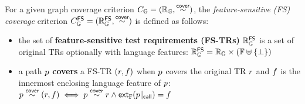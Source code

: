 \begin{definition}\label{def:fs-cov}
  For a given graph coverage criterion $C_{\mathbb{G}} = (\mathbb{R}_{\mathbb{G}},
  \overset{\textsf{cover}}{\sim})$, the \textit{feature-sensitive (FS) coverage} criterion
  $C_{\mathbb{G}}^{\textsf{FS}} = (\mathbb{R}_{\mathbb{G}}^{\textsf{FS}}, \overset{\textsf{cover}}{\sim})$ is defined as follows:
  \begin{itemize}
    \item the set of \textbf{feature-sensitive test requirements (FS-TRs)}
      $\mathbb{R}_{\mathbb{G}}^{\textsf{FS}}$ is a set of original TRs optionally with language features:
$
        \mathbb{R}_{\mathbb{G}}^{\textsf{FS}} = \mathbb{R}_{\mathbb{G}} \times (\mathbb{F} \uplus \{ \bot \})
$
    \item a path $p$ \textbf{covers} a FS-TR $(r, f)$ when $p$
      covers the original TR $r$ and $f$ is the innermost enclosing language feature
      of $p$:
$
        p \overset{\textsf{cover}}{\sim} (r, f) \iff p \overset{\textsf{cover}}{\sim} r \wedge
        \textsf{ext}_{\mathbb{F}}({p}\!\mid_{\textsf{call}}) = f
$
  \end{itemize}
\end{definition}


